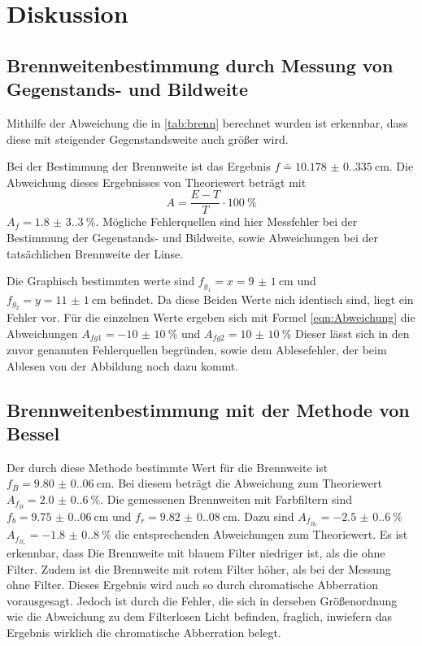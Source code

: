 \section{Diskussion}
\label{sec:Diskussion}
\subsection{Brennweitenbestimmung durch Messung von Gegenstands- und Bildweite}
Mithilfe der Abweichung die in \ref{tab:brenn} berechnet wurden ist erkennbar, dass diese mit steigender Gegenstandsweite auch größer wird.

Bei der Bestimmung der Brennweite ist das Ergebnis $f \bar=\qty{10.178(0.335)}{\centi\meter}$. 
Die Abweichung dieses Ergebnisses von Theoriewert beträgt mit 
\begin{equation}
    A=\frac{E-T}{T} \cdot \qty{100}{\percent}
    \label{eqn:Abweichung}
\end{equation}
$A_f=\qty{1.8(3.3)}{\percent}$.
Mögliche Fehlerquellen sind hier Messfehler bei der Bestimmung der Gegenstands- und Bildweite, sowie Abweichungen bei der tatsächlichen Brennweite der Linse.

Die Graphisch bestimmten werte sind $f_{g_1}=x=\qty{9(1)}{\centi\meter}$ und $f_{g_2}=y=\qty{11(1)}{\centi\meter}$ befindet.
Da diese Beiden Werte nich identisch sind, liegt ein Fehler vor.
Für die einzelnen Werte ergeben sich mit Formel \ref{eqn:Abweichung} die Abweichungen $A_{fg1}=\qty{-10(10)}{\percent}$ und $A_{fg2}=\qty{10(10)}{\percent}$
Dieser lässt sich in den zuvor genannten Fehlerquellen begründen, sowie dem Ablesefehler, der beim Ablesen von der Abbildung noch dazu kommt.

\subsection{Brennweitenbestimmung mit der Methode von Bessel}
Der durch diese Methode bestimmte Wert für die Brennweite ist $f_{B}=\qty{9.80(0.06)}{\centi\meter}$.
Bei diesem beträgt die Abweichung zum Theoriewert $A_{f_B}=\qty{2.0(0.6)}{\percent}$.
Die gemessenen Brennweiten mit Farbfiltern sind $f_b=\qty{9.75(0.06)}{\centi\meter}$ und $f_r=\qty{9.82(0.08)}{\centi\meter}$.
Dazu sind $A_{f_B_b}=\qty{-2.5(0.6)}{\percent}$ $A_{f_B_r}=\qty{-1.8(0.8)}{\percent}$ die entsprechenden Abweichungen zum Theoriewert.
Es ist erkennbar, dass Die Brennweite mit blauem Filter niedriger ist, als die ohne Filter.
Zudem ist die Brennweite mit rotem Filter höher, als bei der Messung ohne Filter.
Dieses Ergebnis wird auch so durch chromatische Abberration vorausgesagt.
Jedoch ist durch die Fehler, die sich in derseben Größenordnung wie die Abweichung zu dem Filterlosen Licht befinden, fraglich, inwiefern das Ergebnis wirklich die chromatische Abberration belegt.


